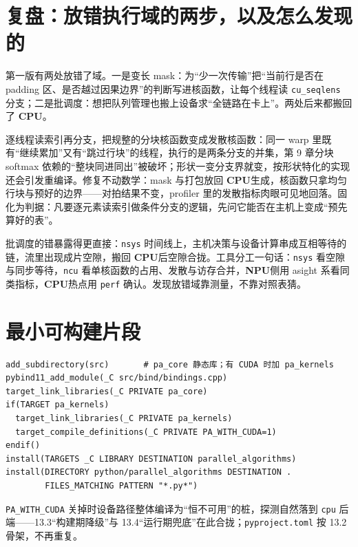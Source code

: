 \documentclass[12pt,a4paper,fontset=fandol]{ctexbook}
\newcommand{\Tp}[1]{\texttt{#1}}
\newcommand{\Dom}[1]{\textsf{\bfseries #1}}
\newcommand{\CPU}{\Dom{CPU}}
\newcommand{\NPU}{\Dom{NPU}}
\begin{document}
\section{复盘：放错执行域的两步，以及怎么发现的}

第一版有两处放错了域。一是变长 mask：为``少一次传输''把``当前行是否在 padding 区、是否越过因果边界''的判断写进核函数，让每个线程读 \Tp{cu\_seqlens} 分支；二是批调度：想把队列管理也搬上设备求``全链路在卡上''。两处后来都搬回了 \CPU{}。

\begin{warning}[title={把变长 mask 塞进核函数的教训}]
逐线程读索引再分支，把规整的分块核函数变成发散核函数：同一 warp 里既有``继续累加''又有``跳过行块''的线程，执行的是两条分支的并集，第 9 章分块 softmax 依赖的``整块同进同出''被破坏；形状一变分支界就变，按形状特化的实现还会引发重编译。修复不动数学：mask 与打包放回 \CPU{}生成，核函数只拿均匀行块与预好的边界——对拍结果不变，profiler 里的发散指标肉眼可见地回落。固化为判据：凡要逐元素读索引做条件分支的逻辑，先问它能否在主机上变成``预先算好的表''。
\end{warning}

批调度的错暴露得更直接：\Tp{nsys} 时间线上，主机决策与设备计算串成互相等待的链，流里出现成片空隙，搬回 \CPU{}后空隙合拢。工具分工一句话：\Tp{nsys} 看空隙与同步等待，\Tp{ncu} 看单核函数的占用、发散与访存合并，\NPU{}侧用 asight 系看同类指标，\CPU{}热点用 \Tp{perf} 确认。发现放错域靠测量，不靠对照表猜。

\section{最小可构建片段}

\begin{lstlisting}[style=cmakestyle,caption={CMakeLists.txt（节选）：合装一个模块}]
add_subdirectory(src)       # pa_core 静态库；有 CUDA 时加 pa_kernels
pybind11_add_module(_C src/bind/bindings.cpp)
target_link_libraries(_C PRIVATE pa_core)
if(TARGET pa_kernels)
  target_link_libraries(_C PRIVATE pa_kernels)
  target_compile_definitions(_C PRIVATE PA_WITH_CUDA=1)
endif()
install(TARGETS _C LIBRARY DESTINATION parallel_algorithms)
install(DIRECTORY python/parallel_algorithms DESTINATION .
        FILES_MATCHING PATTERN "*.py*")
\end{lstlisting}
\Tp{PA\_WITH\_CUDA} 关掉时设备路径整体编译为``恒不可用''的桩，探测自然落到 \Tp{cpu} 后端——13.3``构建期降级''与 13.4``运行期兜底''在此合拢；\Tp{pyproject.toml} 按 13.2 骨架，不再重复。
\end{document}
